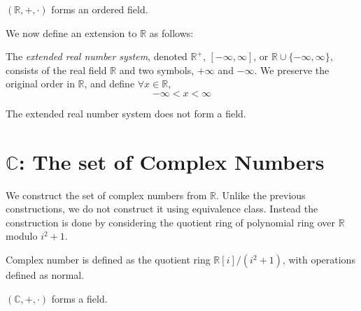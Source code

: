 \documentclass{report}
\begin{document}
			\begin{thm}
				$(\mathbb{R},+,\cdot)$ forms an ordered field.
			\end{thm}

			We now define an extension to $\mathbb{R}$ as follows:

			\begin{defn} \label{def_extended_real_number_system}
				The \emph{extended real number system}, denoted $\mathbb{R}^+$, $[-\infty,\infty]$, or $\mathbb{R} \cup \{-\infty,\infty\}$, consists of the real field $\mathbb{R}$ and two symbols, $+\infty$ and $-\infty$. We preserve the original order in $\mathbb{R}$, and define $\forall x \in \mathbb{R}$,
				\begin{displaymath}
				-\infty<x<\infty
				\end{displaymath}
			\end{defn}
			
			\begin{remark} \label{remark_extended_real_number_system_not_field}
				The extended real number system does not form a field.
			\end{remark}

	\section{$\mathbb{C}$: The set of Complex Numbers}
			We construct the set of complex numbers from $\mathbb{R}$. Unlike the previous constructions, we do not construct it using equivalence class. Instead the construction is done by considering the quotient ring of polynomial ring over $\mathbb{R}$ modulo $i^2+1$.
			
			\begin{defn} \label{def_C_quotient_ring}
				Complex number is defined as the quotient ring $\mathbb{R}[i]/(i^2+1)$, with operations defined as normal.
			\end{defn}
		
			\begin{thm}
				$(\mathbb{C},+,\cdot)$ forms a field.
			\end{thm}
		
\end{document}
